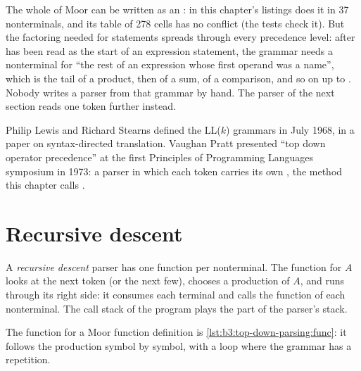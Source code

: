 \label{out:b3:top-down-parsing:table}

The whole of Moor can be written as an :  in this chapter's listings does it in 37 nonterminals, and its table of 278 cells has no conflict (the tests check it). But the factoring needed for statements spreads through every precedence level: after  has been read as the start of an expression statement, the grammar needs a nonterminal for ``the rest of an expression whose first operand was a name'', which is the tail of a product, then of a sum, of a comparison, and so on up to \code{||}. Nobody writes a parser from that grammar by hand. The parser of the next section reads one token further instead.

\begin{history}
Philip Lewis and Richard Stearns defined the LL($k$) grammars in July 1968, in a paper on syntax-directed translation. %
Vaughan Pratt presented ``top down operator precedence'' at the first Principles of Programming Languages symposium in 1973: a parser in which each token carries its own , the method this chapter calls . %
\end{history}

\section{Recursive descent}\label{sec:b3:top-down-parsing:descent}

\begin{definition}\label{def:b3:top-down-parsing:descent}
A \emph{recursive descent} parser has one function per nonterminal. The function for $A$ looks at the next token (or the next few), chooses a production of $A$, and runs through its right side: it consumes each terminal and calls the function of each nonterminal. The call stack of the program plays the part of the parser's stack.
\end{definition}

The function for a Moor function definition is \cref{lst:b3:top-down-parsing:func}: it follows the production  symbol by symbol, with a loop where the grammar has a repetition.

